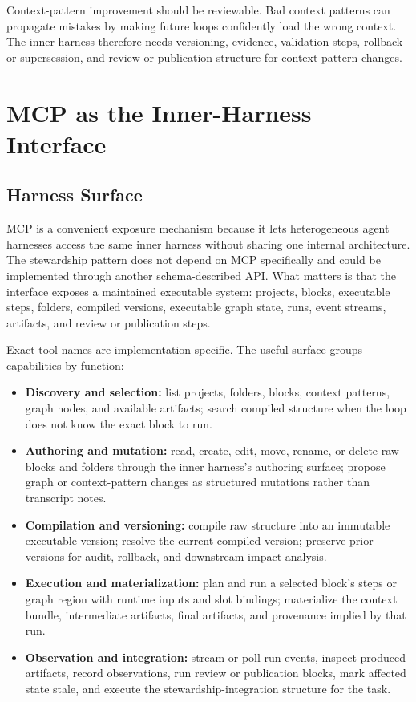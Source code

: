 \documentclass{article}
\begin{document}
Context-pattern improvement should be reviewable. Bad context patterns can propagate mistakes by making future loops confidently load the wrong context. The inner harness therefore needs versioning, evidence, validation steps, rollback or supersession, and review or publication structure for context-pattern changes.

\section{MCP as the Inner-Harness Interface}

\subsection{Harness Surface}

MCP is a convenient exposure mechanism because it lets heterogeneous agent harnesses access the same inner harness without sharing one internal architecture. The stewardship pattern does not depend on MCP specifically and could be implemented through another schema-described API. What matters is that the interface exposes a maintained executable system: projects, blocks, executable steps, folders, compiled versions, executable graph state, runs, event streams, artifacts, and review or publication steps.

Exact tool names are implementation-specific. The useful surface groups capabilities by function:
\begin{itemize}[leftmargin=*]
\item \textbf{Discovery and selection:} list projects, folders, blocks, context patterns, graph nodes, and available artifacts; search compiled structure when the loop does not know the exact block to run.
\item \textbf{Authoring and mutation:} read, create, edit, move, rename, or delete raw blocks and folders through the inner harness's authoring surface; propose graph or context-pattern changes as structured mutations rather than transcript notes.
\item \textbf{Compilation and versioning:} compile raw structure into an immutable executable version; resolve the current compiled version; preserve prior versions for audit, rollback, and downstream-impact analysis.
\item \textbf{Execution and materialization:} plan and run a selected block's steps or graph region with runtime inputs and slot bindings; materialize the context bundle, intermediate artifacts, final artifacts, and provenance implied by that run.
\item \textbf{Observation and integration:} stream or poll run events, inspect produced artifacts, record observations, run review or publication blocks, mark affected state stale, and execute the stewardship-integration structure for the task.
\end{itemize}
\end{document}
